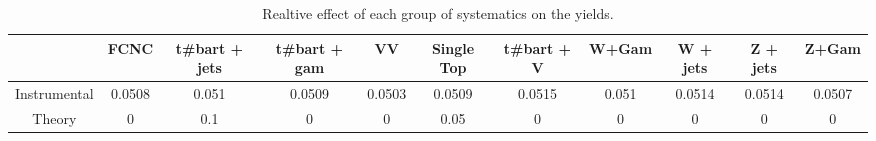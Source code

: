 \begin{table}[htbp]
\begin{center}
\begin{tabular}{|c|c|c|c|c|c|c|c|c|c|c|}
\hline 
      & FCNC      & t#bar{t} + jets      & t#bar{t} +  gam      & VV      & Single Top      & t#bar{t} + V      & W+Gam      & W + jets      & Z + jets      & Z+Gam \\ 
\hline 
 Instrumental & 0.0508 & 0.051 & 0.0509 & 0.0503 & 0.0509 & 0.0515 & 0.051 & 0.0514 & 0.0514 & 0.0507 \\ 
 Theory & 0 & 0.1 & 0 & 0 & 0.05 & 0 & 0 & 0 & 0 & 0 \\ 
\hline 
\end{tabular} 
\caption{Realtive effect of each group of systematics on the yields.} 
\end{center} 
\end{table} 
